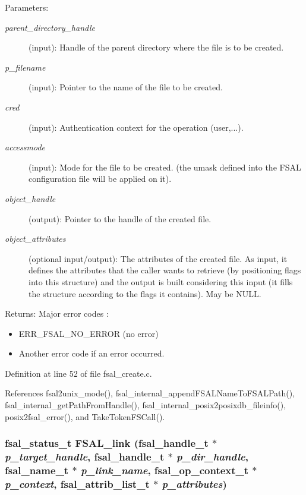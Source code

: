 \begin{Desc}
\item[Parameters:]
\begin{description}
\item[{\em parent\_\-directory\_\-handle}](input): Handle of the parent directory where the file is to be created. \item[{\em p\_\-filename}](input): Pointer to the name of the file to be created. \item[{\em cred}](input): Authentication context for the operation (user,...). \item[{\em accessmode}](input): Mode for the file to be created. (the umask defined into the FSAL configuration file will be applied on it). \item[{\em object\_\-handle}](output): Pointer to the handle of the created file. \item[{\em object\_\-attributes}](optional input/output): The attributes of the created file. As input, it defines the attributes that the caller wants to retrieve (by positioning flags into this structure) and the output is built considering this input (it fills the structure according to the flags it contains). May be NULL.\end{description}
\end{Desc}
\begin{Desc}
\item[Returns:]Major error codes :\begin{itemize}
\item ERR\_\-FSAL\_\-NO\_\-ERROR (no error)\item Another error code if an error occurred. \end{itemize}
\end{Desc}


Definition at line 52 of file fsal\_\-create.c.

References fsal2unix\_\-mode(), fsal\_\-internal\_\-append\-FSALName\-To\-FSALPath(), fsal\_\-internal\_\-get\-Path\-From\-Handle(), fsal\_\-internal\_\-posix2posixdb\_\-fileinfo(), posix2fsal\_\-error(), and Take\-Token\-FSCall().
\subsubsection{\setlength{\rightskip}{0pt plus 5cm}fsal\_\-status\_\-t FSAL\_\-link (fsal\_\-handle\_\-t $\ast$ {\em p\_\-target\_\-handle}, fsal\_\-handle\_\-t $\ast$ {\em p\_\-dir\_\-handle}, fsal\_\-name\_\-t $\ast$ {\em p\_\-link\_\-name}, fsal\_\-op\_\-context\_\-t $\ast$ {\em p\_\-context}, fsal\_\-attrib\_\-list\_\-t $\ast$ {\em p\_\-attributes})}\label{fsal__create_8c_a2}


